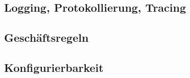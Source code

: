 \subsection{Logging, Protokollierung, Tracing}

\subsection{Geschäftsregeln}

\subsection{Konfigurierbarkeit}

